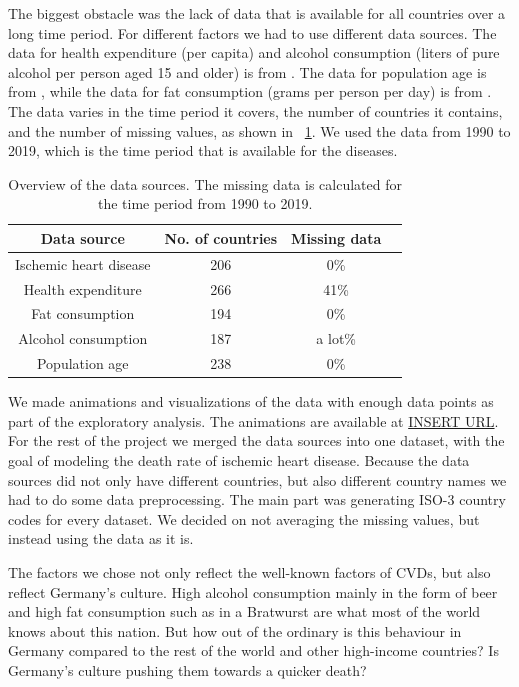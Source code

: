 The biggest obstacle was the lack of data that is available for all countries over a long time period. For different factors we had to use different data sources.
The data for health expenditure (per capita) and alcohol consumption (liters of pure alcohol per person aged 15 and older) is from \citet{oecd}. 
The data for population age is from \citet{age}, while the data for fat consumption (grams per person per day) is from \citet{fat_consumption}. The data varies in the time period it covers,
the number of countries it contains, and the number of missing values, as shown in \tablename~\ref{Data overview}. We used the data from 1990 to 2019, which is the time period
that is available for the diseases.

\begin{table}[h]
    \centering
    \caption{Overview of the data sources. The missing data is calculated for the time period from 1990 to 2019.}
    \label{Data overview}
    \begin{tabular}{|c|c|c|c|}
    \hline
    Data source & No. of countries & Missing data\\
    \hline
    Ischemic heart disease & 206 & 0\%\\
    Health expenditure & 266 & 41\%\\
    Fat consumption & 194 & 0\%\\
    Alcohol consumption & 187 & a lot\%\\
    Population age & 238 & 0\%\\
    \hline
    \end{tabular}
\end{table}

We made animations and visualizations of the data with enough data points as part of the exploratory analysis. The animations are available at \url{INSERT URL}. 
For the rest of the project we merged the data sources into one dataset, with the goal of modeling the death rate of ischemic heart disease. Because the data sources did not 
only have different countries, but also different country names we had to do some data preprocessing. The main part was generating ISO-3 country codes for every dataset. 
We decided on not averaging the missing values, but instead using the data as it is.






The factors we chose not only reflect the well-known factors of CVDs, but also reflect Germany's culture. High alcohol consumption mainly in the form of beer and high fat consumption such as in a Bratwurst are what most of the world knows about this nation. But how out of the ordinary is this behaviour in Germany compared to the rest of the world and other high-income countries? Is Germany's culture pushing them towards a quicker death?


